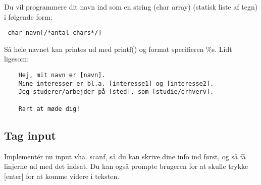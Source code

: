 \documentclass[hidelinks]{article} %
\begin{document}
Du vil programmere dit navn ind som en string (char array) (statisk liste af tegn) i følgende form:
\begin{verbatim} char navn[/*antal chars*/]
\end{verbatim}
Så hele navnet kan printes ud med printf() og format specifieren \%s.
Lidt ligesom:
\begin{verbatim}
	Hej, mit navn er [navn].
	Mine interesser er bl.a. [interesse1] og [interesse2].
	Jeg studerer/arbejder på [sted], som [studie/erhverv].
	
	Rart at møde dig!
\end{verbatim}
	\subsection{Tag input}
	Implementér nu input vha. scanf, så du kan skrive dine info ind først, og så få linjerne ud med det indsat. Du kan også prompte brugeren for at skulle trykke [enter] for at komme videre i teksten.
\end{document}
